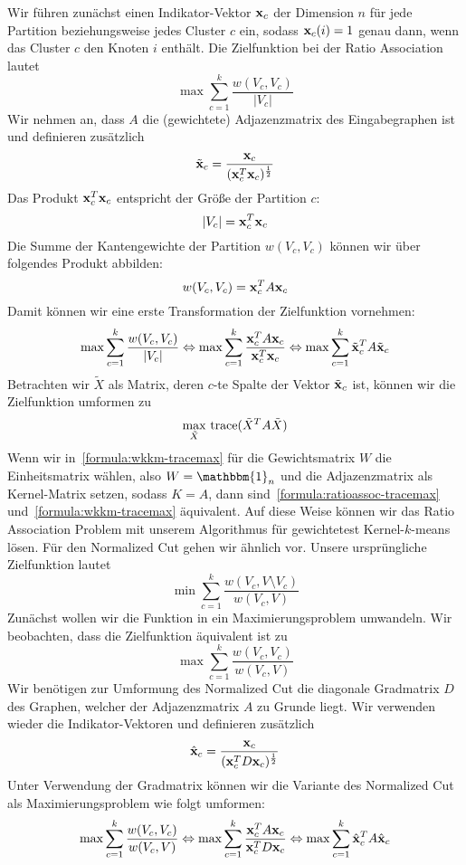 Wir führen zunächst einen Indikator-Vektor $\mathbf{x}_c$ der Dimension $n$ für jede Partition beziehungsweise jedes Cluster $c$
ein, sodass $\mathbf{x}_c(i) = 1$ genau dann, wenn das Cluster $c$ den Knoten $i$ enthält. Die Zielfunktion bei der Ratio
Association lautet
\[ \max \sum_{c=1}^{k} \frac{w(V_c, V_c)}{\left|V_c\right|} \]
Wir nehmen an, dass $A$ die (gewichtete) Adjazenzmatrix des Eingabegraphen ist und definieren zusätzlich
\[ \tilde{\mathbf{x}}_c = \frac{\mathbf{x}_c}{(\mathbf{x}_c^T \mathbf{x}_c)^\frac{1}{2}} \]
Das Produkt $\mathbf{x}_c^T \mathbf{x}_c$ entspricht der Größe der Partition $c$:
\[ \left|V_c\right| = \mathbf{x}_c^T \mathbf{x}_c \]
Die Summe der Kantengewichte der Partition $w(V_c, V_c)$ können wir über folgendes Produkt abbilden:
\[ w(V_c, V_c) = \mathbf{x}_c^T A \mathbf{x}_c \]
Damit können wir eine erste Transformation der Zielfunktion vornehmen:
\[ \max \sum_{c=1}^{k} \frac{w(V_c, V_c)}{\left|V_c\right|}
	\Leftrightarrow \max \sum_{c=1}^{k} \frac{\mathbf{x}_c^T A \mathbf{x}_c}{\mathbf{x}_c^T \mathbf{x}_c}
	\Leftrightarrow \max \sum_{c=1}^{k} \tilde{\mathbf{x}}_c^T A \tilde{\mathbf{x}}_c \]
Betrachten wir $\tilde{X}$ als Matrix, deren $c$-te Spalte der Vektor $\tilde{\mathbf{x}}_c$ ist, können wir die Zielfunktion
umformen zu
\begin{align}
\label{formula:ratioassoc-tracemax}
	\max_{\tilde{X}}{} \operatorname*{trace}( \tilde{X}^T A \tilde{X} )
\end{align}
Wenn wir in~\ref{formula:wkkm-tracemax} für die Gewichtsmatrix $W$ die Einheitsmatrix wählen, also $W = \mathbbm{1}_n$ und
die Adjazenzmatrix als Kernel-Matrix setzen, sodass $K = A$, dann sind~\ref{formula:ratioassoc-tracemax}
und~\ref{formula:wkkm-tracemax} äquivalent. Auf diese Weise können wir das Ratio Association Problem mit unserem Algorithmus
für gewichtetest Kernel-$k$-means lösen.
\absatz
Für den Normalized Cut gehen wir ähnlich vor. Unsere ursprüngliche Zielfunktion lautet
\[ \min \sum_{c=1}^{k} \frac{w(V_c, V \setminus V_c)}{w(V_c, V)} \]
Zunächst wollen wir die Funktion in ein Maximierungsproblem umwandeln. Wir beobachten, dass die Zielfunktion äquivalent ist
zu
\[ \max \sum_{c=1}^{k} \frac{w(V_c, V_c)}{w(V_c, V)} \]
Wir benötigen zur Umformung des Normalized Cut die diagonale Gradmatrix $D$ des Graphen, welcher der Adjazenzmatrix $A$ zu
Grunde liegt. Wir verwenden wieder die Indikator-Vektoren und definieren zusätzlich
\[ \hat{\mathbf{x}}_c = \frac{\mathbf{x}_c}{ (\mathbf{x}_c^T D \mathbf{x}_c)^{\frac{1}{2}} } \]
Unter Verwendung der Gradmatrix können wir die Variante des Normalized Cut als Maximierungsproblem wie folgt umformen:
\[ \max \sum_{c=1}^{k} \frac{w(V_c, V_c)}{w(V_c, V)}
	\Leftrightarrow \max \sum_{c=1}^{k} \frac{\mathbf{x}_c^T A \mathbf{x}_c}{\mathbf{x}_c^T D \mathbf{x}_c} 
	\Leftrightarrow \max \sum_{c=1}^{k} \hat{\mathbf{x}}_c^T A \hat{\mathbf{x}}_c \]
